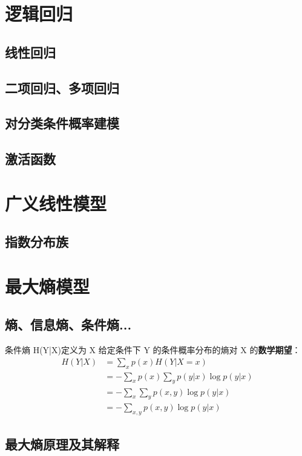     \section{逻辑回归}
    \subsection{线性回归}
    \subsection{二项回归、多项回归}
    \subsection{对分类条件概率建模}
    \subsection{激活函数}
    \section{广义线性模型}
    \subsection{指数分布族}

    \section{最大熵模型}
    \subsection{熵、信息熵、条件熵...}
    条件熵 H(Y|X)定义为 X 给定条件下 Y 的条件概率分布的熵对 X 的\textbf{数学期望}：
    \begin{equation}
        \begin{aligned} 
            H(Y | X) &=\sum_{x} p(x) H(Y | X=x) \\ 
                &=-\sum_{x} p(x) \sum_{y} p(y | x) \log p(y | x) \\
                &=-\sum_{x} \sum_{y} p(x, y) \log p(y | x) \\ 
                &=-\sum_{x, y} p(x, y) \log p(y | x) 
        \end{aligned}
    \end{equation}
    \subsection{最大熵原理及其解释}
